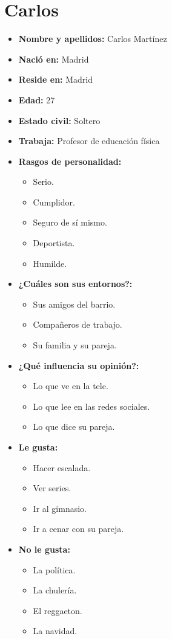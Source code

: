 \section{Carlos}

\begin{itemize}
  \item \textbf{Nombre y apellidos: } Carlos Martínez
  \item \textbf{Nació en: } Madrid
  \item \textbf{Reside en: } Madrid
  \item \textbf{Edad: } 27
  \item \textbf{Estado civil: } Soltero
  \item \textbf{Trabaja: } Profesor de educación física
  \item \textbf{Rasgos de personalidad: } 
  \begin{itemize}
    \item Serio.
    \item Cumplidor.
    \item Seguro de sí mismo.
    \item Deportista.
    \item Humilde.
  \end{itemize}
  \item \textbf{¿Cuáles son sus entornos?: } 
  \begin{itemize}
    \item Sus amigos del barrio.
    \item Compañeros de trabajo.
    \item Su familia y su pareja.
  \end{itemize}
  \item \textbf{¿Qué influencia su opinión?: } 
  \begin{itemize}
    \item Lo que ve en la tele.
    \item Lo que lee en las redes sociales.
    \item Lo que dice su pareja.
  \end{itemize}
  \item \textbf{Le gusta: } 
  \begin{itemize}
    \item Hacer escalada.
    \item Ver series.
    \item Ir al gimnasio.
    \item Ir a cenar con su pareja.
  \end{itemize}
  \item \textbf{No le gusta: } 
  \begin{itemize}
    \item La política.
    \item La chulería.
    \item El reggaeton.
    \item La navidad.
  \end{itemize}

\end{itemize}